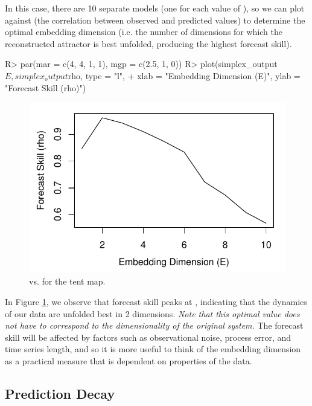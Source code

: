 \documentclass[article]{jss}
\begin{document}
In this case, there are 10 separate models (one for each value of ), so we can plot  against  (the correlation between observed and predicted values) to determine the optimal embedding dimension (i.e. the number of dimensions for which the reconstructed attractor is best unfolded, producing the highest forecast skill).

\begin{Schunk}
\begin{Sinput}
R> par(mar = c(4, 4, 1, 1), mgp = c(2.5, 1, 0))
R> plot(simplex_output$E, simplex_output$rho, type = "l",  
+       xlab = "Embedding Dimension (E)", ylab = "Forecast Skill (rho)")
\end{Sinput}
\end{Schunk}

\begin{figure}[t!]
\centering
\includegraphics[width=4.5in]{article-simplex-e}
\caption{\label{fig:simplex-e}  vs.  for the tent map.}
\end{figure}

In Figure \ref{fig:simplex-e}, we observe that forecast skill peaks at , indicating that the dynamics of our data are unfolded best in 2 dimensions. \emph{Note that this optimal value does not have to correspond to the dimensionality of the original system.}  The forecast skill will be affected by factors such as observational noise, process error, and time series length, and so it is more useful to think of the embedding dimension as a practical measure that is dependent on properties of the data.

\subsection{Prediction Decay}\label{sec:prediction-decay}
\end{document}
